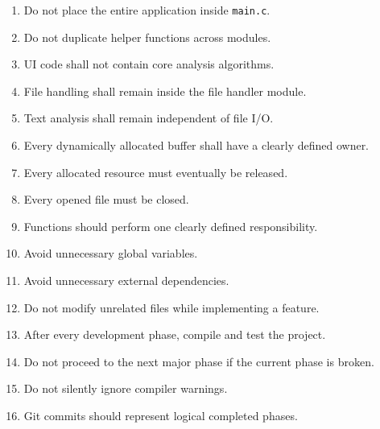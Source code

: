 \documentclass[12pt,a4paper]{article}
\begin{document}
\begin{enumerate}

    \item Do not place the entire application inside
    \texttt{main.c}.

    \item Do not duplicate helper functions across modules.

    \item UI code shall not contain core analysis algorithms.

    \item File handling shall remain inside the file handler module.

    \item Text analysis shall remain independent of file I/O.

    \item Every dynamically allocated buffer shall have a clearly
    defined owner.

    \item Every allocated resource must eventually be released.

    \item Every opened file must be closed.

    \item Functions should perform one clearly defined responsibility.

    \item Avoid unnecessary global variables.

    \item Avoid unnecessary external dependencies.

    \item Do not modify unrelated files while implementing a feature.

    \item After every development phase, compile and test the project.

    \item Do not proceed to the next major phase if the current phase
    is broken.

    \item Do not silently ignore compiler warnings.

    \item Git commits should represent logical completed phases.

\end{enumerate}

\end{document}

